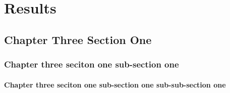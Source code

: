\chapter{Results}
\section{Chapter Three Section One}
\subsection{Chapter three seciton one sub-section one}
\subsubsection{Chapter three seciton one sub-section one sub-sub-section one}

